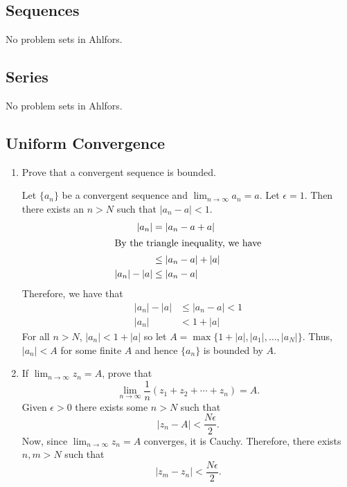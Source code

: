 \subsection{Sequences}

No problem sets in Ahlfors.

\subsection{Series}

No problem sets in Ahlfors.

\subsection{Uniform Convergence}

\begin{enumerate}
\item
  Prove that a convergent sequence is bounded.
  \par\smallskip
  Let \(\{a_n\}\) be a convergent sequence and \(\lim_{n\to\infty}a_n = a\).
  Let \(\epsilon = 1\).
  Then there exists an \(n > N\) such that \(\lvert a_n - a\rvert < 1\).
  \begin{align*}
    \lvert a_n\rvert & = \lvert a_n - a + a\rvert\\
    \intertext{By the triangle inequality, we have}
                     & \leq \lvert a_n - a\rvert + \lvert a\rvert\\
    \lvert a_n\rvert - \lvert a\rvert & \leq \lvert a_n - a\rvert
  \end{align*}
  Therefore, we have that
  \begin{align*}
    \lvert a_n\rvert - \lvert a\rvert & \leq\lvert a_n - a\rvert < 1\\
    \lvert a_n\rvert & < 1 + \lvert a\rvert
  \end{align*}
  For all \(n > N\), \(\lvert a_n\rvert < 1 + \lvert a\rvert\) so let
  \(A = \max\bigl\{1 + \lvert a\rvert,\lvert a_1\rvert,\ldots,
  \lvert a_N\rvert\bigr\}\).
  Thus, \(\lvert a_n\rvert < A\) for some finite \(A\) and hence \(\{a_n\}\) is
  bounded by \(A\).
\item
  If \(\lim_{n\to\infty}z_n = A\), prove that
  \[
  \lim_{n\to\infty}\frac{1}{n}(z_1 + z_2 + \cdots + z_n) = A.
  \]
  Given \(\epsilon > 0\) there exists some \(n > N\) such that
  \[
  \lvert z_n - A\rvert < \frac{N\epsilon}{2}.
  \]
  Now, since \(\lim_{n\to\infty}z_n = A\) converges, it is Cauchy.
  Therefore, there exists \(n,m > N\) such that
  \[
  \lvert z_m - z_n\rvert < \frac{N\epsilon}{2}.
\]
\end{enumerate}
